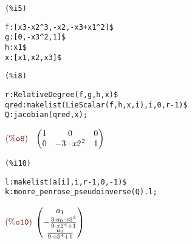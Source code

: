 \noindent
\begin{minipage}[t]{8ex}\color{red}\bf
\begin{verbatim}
(%i5) 
\end{verbatim}
\end{minipage}
\begin{minipage}[t]{\textwidth}\color{blue}
\begin{verbatim}
f:[x3-x2^3,-x2,-x3+x1^2]$
g:[0,-x3^2,1]$
h:x1$
x:[x1,x2,x3]$
\end{verbatim}
\end{minipage}

\smallskip

\noindent
\begin{minipage}[t]{8ex}\color{red}\bf
\begin{verbatim}
(%i8) 
\end{verbatim}
\end{minipage}
\begin{minipage}[t]{\textwidth}\color{blue}
\begin{verbatim}
r:RelativeDegree(f,g,h,x)$
qred:makelist(LieScalar(f,h,x,i),i,0,r-1)$
Q:jacobian(qred,x);
\end{verbatim}
\end{minipage}

\noindent
$\displaystyle
\parbox{8ex}{$\color{labelcolor}\mathrm{\tt (\%o8) }\quad $}
\begin{pmatrix}1 & 0 & 0\cr 0 & -3\cdot {{\mathit{x2}}^{2}} & 1\end{pmatrix}\mbox{}
$


\noindent
\begin{minipage}[t]{8ex}\color{red}\bf
\begin{verbatim}
(%i10) 
\end{verbatim}
\end{minipage}
\begin{minipage}[t]{\textwidth}\color{blue}
\begin{verbatim}
l:makelist(a[i],i,r-1,0,-1)$
k:moore_penrose_pseudoinverse(Q).l;
\end{verbatim}
\end{minipage}

\noindent
$\displaystyle
\parbox{8ex}{$\color{labelcolor}\mathrm{\tt (\%o10) }\quad $}
\begin{pmatrix}{{a}_{1}}\cr -\frac{3\cdot {{a}_{0}}\cdot {{\mathit{x2}}^{2}}}{9\cdot {{\mathit{x2}}^{4}}+1}\cr \frac{{{a}_{0}}}{9\cdot {{\mathit{x2}}^{4}}+1}\end{pmatrix}\mbox{}
$
